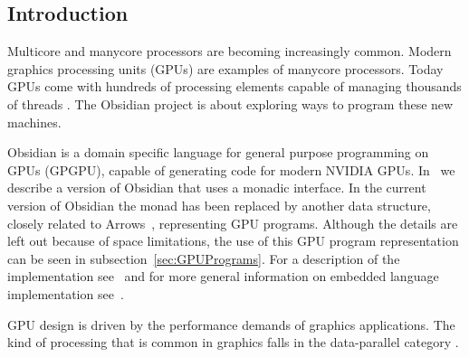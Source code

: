 








\subsection{Introduction} 

Multicore and manycore processors are becoming increasingly common. Modern 
graphics processing units (GPUs) are examples of manycore processors. Today 
GPUs come with hundreds of processing elements capable of managing thousands 
of threads \cite{Brief8800}. The Obsidian project is about exploring ways 
to program these new machines.  

Obsidian is a domain specific language for general purpose programming on 
GPUs (GPGPU), capable of generating code for modern NVIDIA GPUs. 
In~\cite{JSMSKC_IFL08} we describe a version of Obsidian that uses a monadic 
interface. In the current version of Obsidian the monad has been replaced 
by another data structure, closely related to Arrows~\cite{Arrows}, representing GPU programs. Although the details are 
left out because of space limitations, the use of this GPU program representation 
can be seen in subsection~\ref{sec:GPUPrograms}. For a description of the implementation 
see~\cite{JSTECH} and for more general information on embedded language 
implementation see~\cite{Elliott03:CompileDSEL-JFP}.

GPU design is driven by the performance demands of graphics applications. 
The kind of processing that is common in graphics falls in the data-parallel 
category \cite{GEMS2}.



